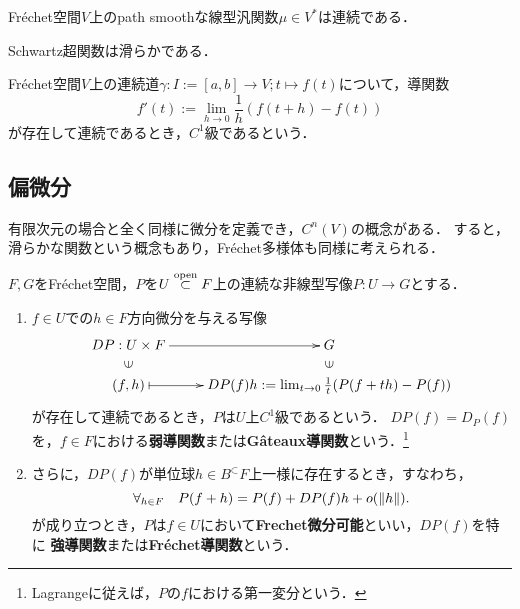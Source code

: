 \documentclass[uplatex,dvipdfmx]{jsreport}
\begin{document}
\begin{proposition}
    Fréchet空間$V$上のpath smoothな線型汎関数$\mu\in V^*$は連続である．
\end{proposition}

\begin{corollary}
    Schwartz超関数は滑らかである．
\end{corollary}

\begin{definition}[曲線の微分]
    Fréchet空間$V$上の連続道$\gamma:I:=[a,b]\to V;t\mapsto f(t)$について，導関数
    \[f'(t):=\lim_{h\to0}\frac{1}{h}(f(t+h)-f(t))\]
    が存在して連続であるとき，$C^1$級であるという．
\end{definition}

\subsection{偏微分}

\begin{tcolorbox}[colframe=ForestGreen, colback=ForestGreen!10!white,breakable,colbacktitle=ForestGreen!40!white,coltitle=black,fonttitle=\bfseries\sffamily,
title=]
    有限次元の場合と全く同様に微分を定義でき，$C^n(V)$の概念がある．
    すると，滑らかな関数という概念もあり，Fréchet多様体も同様に考えられる．
\end{tcolorbox}

\begin{definition}
    $F,G$をFréchet空間，$P$を$U\overset{\mathrm{open}}{\subset} F$上の連続な非線型写像$P:U\to G$とする．
    \begin{enumerate}
        \item 
    $f\in U$での$h\in F$方向微分を与える写像
    \[\xymatrix@R-2pc{
        DP:U\times F\ar[r]&G\\
        \rotatebox[origin=c]{90}{$\in$}&\rotatebox[origin=c]{90}{$\in$}\\
        (f,h)\ar@{|->}[r]&DP(f)h:=\lim_{t\to0}\frac{1}{t}(P(f+th)-P(f))
    }\]
    が存在して連続であるとき，$P$は$U$上$C^1$級であるという．
    $DP(f)=D_P(f)$を，$f\in F$における\textbf{弱導関数}または\textbf{Gâteaux導関数}という．\footnote{Lagrangeに従えば，$P$の$f$における第一変分という．}
    \item さらに，$DP(f)$が単位球$h\in B^\subset F$上一様に存在するとき，すなわち，
    \[\forall_{h\in F}\quad P(f+h)=P(f)+DP(f)h+o(\|h\|).\]
    が成り立つとき，$P$は$f\in U$において\textbf{Frechet微分可能}といい，$DP(f)$を特に
    \textbf{強導関数}または\textbf{Fréchet導関数}という．
    \end{enumerate}
\end{definition}
\end{document}
